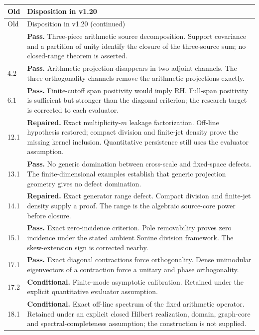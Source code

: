 \documentclass[11pt]{article}
\theoremstyle{remark}
\begin{document}
\small
\begin{longtable}{@{}p{}p{}@{}}
\toprule Old & Disposition in v1.20 \\
\midrule\endfirsthead
\toprule Old & Disposition in v1.20 (continued) \\
\midrule\endhead
\bottomrule\endfoot
4.1 & \textbf{Pass.} Three-piece arithmetic source decomposition. Support covariance and a partition of unity identify the closure of the three-source sum; no closed-range theorem is asserted. \\[4pt]
4.2 & \textbf{Pass.} Arithmetic projection disappears in two adjoint channels. The three orthogonality channels remove the arithmetic projections exactly. \\[4pt]
6.1 & \textbf{Pass.} Finite-cutoff span positivity would imply RH. Full-span positivity is sufficient but stronger than the diagonal criterion; the research target is corrected to each evaluator. \\[4pt]
12.1 & \textbf{Repaired.} Exact multiplicity-$m$ leakage factorization. Off-line hypothesis restored; compact division and finite-jet density prove the missing kernel inclusion. Quantitative persistence still uses the evaluator assumption. \\[4pt]
13.1 & \textbf{Pass.} No generic domination between cross-scale and fixed-space defects. The finite-dimensional examples establish that generic projection geometry gives no defect domination. \\[4pt]
14.1 & \textbf{Repaired.} Exact generator range defect. Compact division and finite-jet density supply a proof. The range is the algebraic source-core power before closure. \\[4pt]
15.1 & \textbf{Pass.} Exact zero-incidence criterion. Pole removability proves zero incidence under the stated ambient Sonine division framework. The skew-extension sign is corrected nearby. \\[4pt]
17.1 & \textbf{Pass.} Exact diagonal contractions force orthogonality. Dense unimodular eigenvectors of a contraction force a unitary and phase orthogonality. \\[4pt]
17.2 & \textbf{Conditional.} Finite-mode asymptotic calibration. Retained under the explicit quantitative evaluator assumption. \\[4pt]
18.1 & \textbf{Conditional.} Exact off-line spectrum of the fixed arithmetic operator. Retained under an explicit closed Hilbert realization, domain, graph-core and spectral-completeness assumption; the construction is not supplied. \\[4pt]

\end{longtable}
\end{document}
